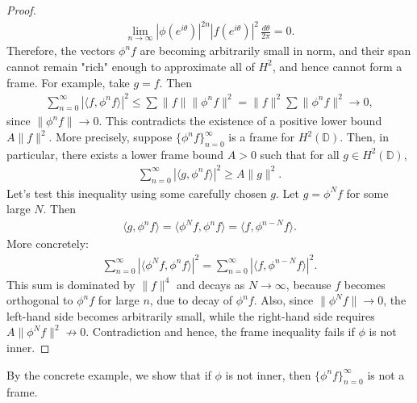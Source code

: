 \documentclass[12pt,titlepage]{amsart}
\theoremstyle{definition}
\theoremstyle{remark}
\begin{document}
\begin{proof}
\begin{eqnarray*}
\lim_{n\rightarrow\infty}|\phi(e^{i\theta})|^{2n}
|f(e^{i\theta})|^2 \, \frac{d\theta}{2\pi}=0.
\end{eqnarray*}
Therefore, the vectors $\phi^n f$ are becoming arbitrarily small
in norm, and their span cannot remain "rich" enough to approximate
all of $H^2$, and hence cannot form a frame. For example, take $g
= f$. Then
\begin{eqnarray*}
\sum_{n=0}^\infty |\langle f, \phi^n f \rangle|^2 \leq \sum \|f\|
\|\phi^n f\|^2 = \|f\|^2 \sum \|\phi^n f\|^2 \to 0,
\end{eqnarray*}
since $\|\phi^n f\| \to 0$. This contradicts the existence of a
positive lower bound $A \|f\|^2$. More precisely, suppose
$\{\phi^n f\}_{n=0}^\infty$ is a frame for $H^2(\mathbb{D})$.
Then, in particular, there exists a lower frame bound $A>0$ such
that for all $g \in H^2(\mathbb{D})$,
\begin{eqnarray*}
\sum_{n=0}^\infty |\langle g, \phi^n f \rangle|^2 \geq A \|g\|^2.
\end{eqnarray*}
Let's test this inequality using some carefully chosen $g$. Let $g
= \phi^N f$ for some large $N$. Then
\begin{eqnarray*} \langle g, \phi^n f \rangle = \langle \phi^N f,
\phi^n f \rangle = \langle f, \phi^{n - N} f \rangle.
\end{eqnarray*}
 More concretely:
\begin{eqnarray*}
\sum_{n=0}^\infty |\langle \phi^N f, \phi^n f \rangle|^2 =
\sum_{n=0}^\infty |\langle f, \phi^{n - N} f \rangle|^2.
\end{eqnarray*}
This sum is dominated by $\|f\|^4$ and decays as $N \to \infty$,
because $f$ becomes orthogonal to $\phi^n f$ for large $n$, due to
decay of $\phi^n f$. Also, since $\|\phi^N f\| \to 0$, the
left-hand side becomes arbitrarily small, while the right-hand
side requires $A \|\phi^N f\|^2 \not\to 0$. Contradiction and
hence, the frame inequality fails if $\phi$ is not inner.
\end{proof}
By the concrete example, we show that if $\phi$ is not inner, then
$\{\phi^n f\}_{n=0}^\infty $ is not a frame.
\end{document}
